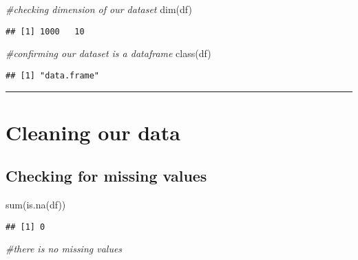 \documentclass[
]{article}
\newenvironment{Shaded}{\begin{snugshade}}{\end{snugshade}}
\newcommand{\CommentTok}[1]{\textcolor[rgb]{0.56,0.35,0.01}{\textit{#1}}}
\newcommand{\FunctionTok}[1]{\textcolor[rgb]{0.00,0.00,0.00}{#1}}
\newcommand{\NormalTok}[1]{#1}
\begin{document}
\begin{Shaded}
\begin{Highlighting}[]
\CommentTok{\#checking dimension of our dataset}
\FunctionTok{dim}\NormalTok{(df)}
\end{Highlighting}
\end{Shaded}

\begin{verbatim}
## [1] 1000   10
\end{verbatim}

\begin{Shaded}
\begin{Highlighting}[]
\CommentTok{\#confirming our dataset is a dataframe}
\FunctionTok{class}\NormalTok{(df)}
\end{Highlighting}
\end{Shaded}

\begin{verbatim}
## [1] "data.frame"
\end{verbatim}

\begin{center}\rule{0.5\linewidth}{0.5pt}\end{center}

\hypertarget{cleaning-our-data}{%
\section{Cleaning our data}\label{cleaning-our-data}}

\hypertarget{checking-for-missing-values}{%
\subsection{Checking for missing
values}\label{checking-for-missing-values}}

\begin{Shaded}
\begin{Highlighting}[]
\FunctionTok{sum}\NormalTok{(}\FunctionTok{is.na}\NormalTok{(df))}
\end{Highlighting}
\end{Shaded}

\begin{verbatim}
## [1] 0
\end{verbatim}

\begin{Shaded}
\begin{Highlighting}[]
\CommentTok{\#there is no missing values }
\end{Highlighting}
\end{Shaded}
\end{document}
